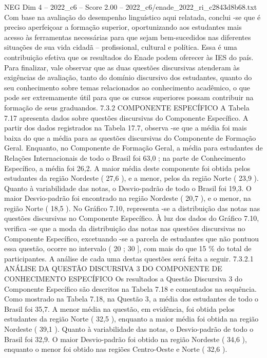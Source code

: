 \begin{textsample}{NEG Dim 4 – 2022\_c6 – Score 2.00 – 2022\_c6/enade\_2022\_ri\_c2843d8b68.txt}
Com base na avaliação do desempenho linguístico aqui relatada, conclui -se que é preciso aperfeiçoar a formação superior, oportunizando aos estudantes mais acesso às ferramentas necessárias para que sejam bem-sucedidos nas diferentes situações de sua vida cidadã – profissional, cultural e política.
Essa é uma contribuição efetiva que os resultados do Enade podem oferecer às IES do país.
Para finalizar, vale observar que as duas questões discursivas atenderam às exigências de avaliação, tanto do domínio discursivo dos estudantes, quanto do seu conhecimento sobre temas relacionados ao conhecimento acadêmico, o que pode ser extremamente útil para que os cursos superiores possam contribuir na formação de seus graduandos. 7.3.2 COMPONENTE ESPECÍFICO A Tabela 7.17 apresenta dados sobre questões discursivas do Componente Específico.
A partir dos dados registrados na Tabela 17.7, observa -se que a média foi mais baixa do que a média para as questões discursivas do Componente de Formação Geral.
Enquanto, no Componente de Formação Geral, a média para estudantes de Relações Internacionais de todo o Brasil foi 63,0 ; na parte de Conhecimento Específico, a média foi 26,2.
A maior média deste componente foi obtida pelos estudantes da região Nordeste ( 27,6 ), e a menor, pelos da região Norte ( 23,9 ).
Quanto à variabilidade das notas, o Desvio-padrão de todo o Brasil foi 19,3.
O maior Desvio-padrão foi encontrado na região Nordeste ( 20,7 ), e o menor, na região Norte ( 18,5 ).
No Gráfico 7.10, representa -se a distribuição das notas nas questões discursivas no Componente Específico.
À luz dos dados do Gráfico 7.10, verifica -se que a moda da distribuição das notas nas questões discursivas no Componente Específico, excetuando -se a parcela de estudantes que não pontuou essa questão, ocorre no intervalo ( 20 ; 30 ], com mais do que 15 \% do total de participantes.
A análise de cada uma destas questões será feita a seguir. 7.3.2.1 ANÁLISE DA QUESTÃO DISCURSIVA 3 DO COMPONENTE DE CONHECIMENTO ESPECÍFICO Os resultados a Questão Discursiva 3 do Componente Específico são descritos na Tabela 7.18 e comentados na sequência.
Como mostrado na Tabela 7.18, na Questão 3, a média dos estudantes de todo o Brasil foi 35,7.
A menor média na questão, em evidência, foi obtida pelos estudantes da região Norte ( 32,5 ), enquanto a maior média foi obtida na região Nordeste ( 39,1 ).
Quanto à variabilidade das notas, o Desvio-padrão de todo o Brasil foi 32,9.
O maior Desvio-padrão foi obtido na região Nordeste ( 34,6 ), enquanto o menor foi obtido nas regiões Centro-Oeste e Norte ( 32,6 ).

\end{textsample}
